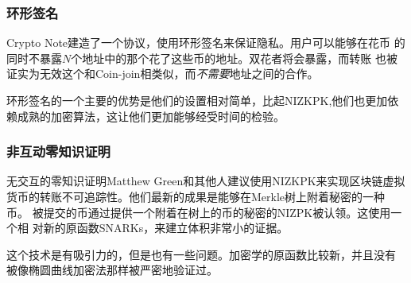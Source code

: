 \documentclass[letterpaper]{article}
\begin{document}
\subsubsection{环形签名}
Crypto Note建造了一个协议，使用环形签名来保证隐私。用户可以能够在花币
的同时不暴露$N$个地址中的那个花了这些币的地址。双花者将会暴露，而转账
也被证实为无效这个和Coin-join相类似，而\emph{不需要}地址之间的合作。

环形签名的一个主要的优势是他们的设置相对简单，比起NIZKPK,他们也更加依
赖成熟的加密算法，这让他们更加能够经受时间的检验。


\subsubsection{非互动零知识证明}
无交互的零知识证明Matthew Green和其他人建议使用NIZKPK来实现区块链虚拟
货币的转账不可追踪性。他们最新的成果是能够在Merkle树上附着秘密的一种币。
被提交的币通过提供一个附着在树上的币的秘密的NIZPK被认领。这使用一个相
对新的原函数SNARKs，来建立体积非常小的证据。

这个技术是有吸引力的，但是也有一些问题。加密学的原函数比较新，并且没有
被像椭圆曲线加密法那样被严密地验证过。
\end{document}
